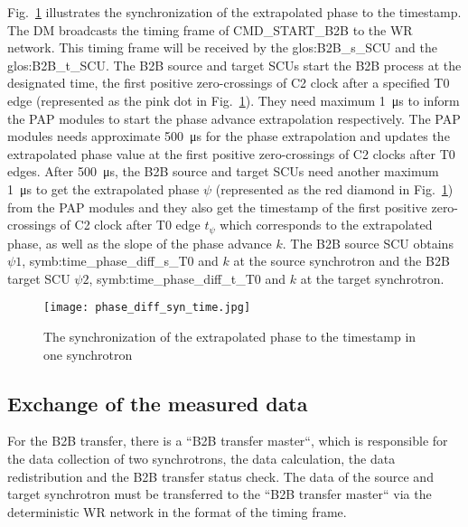 Fig.~\ref{phase_diff_syn_time} illustrates the synchronization of the extrapolated phase to the timestamp. The DM broadcasts the timing frame of CMD\_START\_B2B to the WR network. This timing frame will be received by the \gls{glos:B2B_s_SCU} and the \gls{glos:B2B_t_SCU}. The B2B source and target SCUs start the B2B process at the designated time, the first positive zero-crossings of C2 clock after a specified T0 edge (represented as the pink dot in Fig.~\ref{phase_diff_syn_time}). They need maximum \SI{1}{\us} to inform the PAP modules to start the phase advance extrapolation respectively. The PAP modules needs approximate \SI{500}{\us} for the phase extrapolation and updates the extrapolated phase value at the first positive zero-crossings of C2 clocks after T0 edges. After \SI{500}{\us}, the B2B source and target SCUs need another maximum \SI{1}{\us} to get the extrapolated phase $\psi$ (represented as the red diamond in Fig.~\ref{phase_diff_syn_time}) from the PAP modules and they also get the timestamp of the first positive zero-crossings of C2 clock after T0 edge $t_{\psi}$ which corresponds to the extrapolated phase, as well as the slope of the phase advance $k$. The B2B source SCU obtains $\psi1$, \gls{symb:time_phase_diff_s_T0} and $k$ at the source synchrotron and the B2B target SCU $\psi2$, \gls{symb:time_phase_diff_t_T0} and $k$ at the target synchrotron.
 \begin{figure}[!htb]
   \centering   
   \texttt{[image: phase\_diff\_syn\_time.jpg]}
   \caption{The synchronization of the extrapolated phase to the timestamp in one synchrotron}
   \label{phase_diff_syn_time}
\end{figure}
\subsection{Exchange of the measured data}

For the B2B transfer, there is a ``B2B transfer master``, which is responsible for the data collection of two synchrotrons, the data calculation, the data redistribution and the B2B transfer status check. The data of the source and target synchrotron must be transferred to the ``B2B transfer master`` via the deterministic WR network in the format of the timing frame.
 
